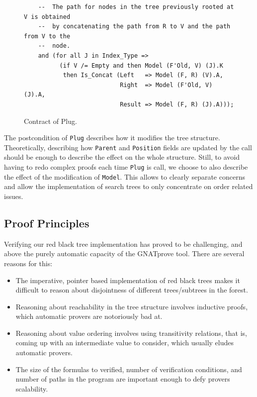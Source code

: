 \documentclass[11pt,a4paper]{article}
\newcommand{\gnatprove}{GNATprove\xspace}
\begin{document}
\begin{figure}
\begin{small}
\begin{lstlisting}
    --  The path for nodes in the tree previously rooted at V is obtained
    --  by concatenating the path from R to V and the path from V to the
    --  node.
    and (for all J in Index_Type =>
          (if V /= Empty and then Model (F'Old, V) (J).K
           then Is_Concat (Left   => Model (F, R) (V).A,
                           Right  => Model (F'Old, V) (J).A,
                           Result => Model (F, R) (J).A)));
\end{lstlisting}
\end{small}
\caption{\label{fig-spec-binary} Contract of Plug.}
\end{figure}

The postcondition of \texttt{Plug} describes how it modifies the tree structure. Theoretically,
describing how \texttt{Parent} and \texttt{Position} fields are updated by the call should be enough to
describe the effect on the whole structure. Still, to avoid having to redo complex
proofs each time \texttt{Plug} is call, we choose to also describe the effect of the modification
of \texttt{Model}. This allows to clearly separate concerns and allow
the implementation of search trees to only concentrate on order related issues.

\subsection{Proof Principles}


Verifying our red black tree implementation has proved to be challenging, and above the
purely automatic capacity of the \gnatprove tool. There are several reasons for this:

\begin{itemize}
 \item The imperative, pointer based implementation of red black trees makes it difficult
 to reason about disjointness of different trees/subtrees in the forest.
 \item Reasoning about reachability in the tree structure involves inductive proofs, which
 automatic provers are notoriously bad at.
 \item Reasoning about value ordering involves using transitivity relations, that is, coming
 up with an intermediate value to consider, which usually eludes automatic provers.
 \item The size of the formulas to verified, number of verification conditions, and number of
 paths in the program are important enough to defy provers scalability.
\end{itemize}
\end{document}
